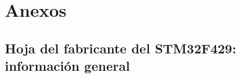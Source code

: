 \newpage
\section{Anexos}


\subsection{Hoja del fabricante del STM32F429: información general} \label{an:01_GEN}
\vspace{\fill}
 
